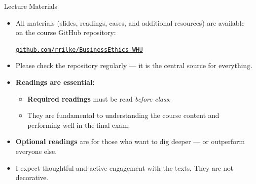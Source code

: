 \documentclass[aspectratio=169, 10pt]{beamer}
\begin{document}
\begin{frame}{Lecture Materials}

\begin{itemize}
  \item All materials (slides, readings, cases, and additional resources) are available on the course GitHub repository:
  
  \vspace{0.5em}
  \begin{center}
      \texttt{\href{https://github.com/rrilke/BusinessEthics-WHU}{github.com/rrilke/BusinessEthics-WHU}}
  \end{center}
  \vspace{0.5em}

  \item Please check the repository regularly — it is the central source for everything.
  
  \item \textbf{Readings are essential:}
  \begin{itemize}
    \item \textbf{Required readings} must be read \emph{before class}.
    \item They are fundamental to understanding the course content and performing well in the final exam.
  \end{itemize}
  \item \textbf{Optional readings} are for those who want to dig deeper — or outperform everyone else. 
  \item I expect thoughtful and active engagement with the texts. They are not decorative.
\end{itemize}

\end{frame}
 
\end{document}
